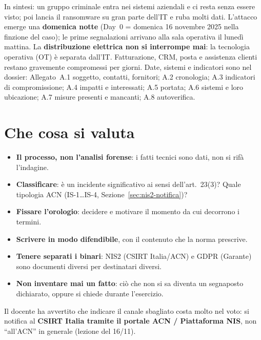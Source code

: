 In sintesi: un gruppo criminale entra nei sistemi aziendali e ci resta senza essere visto; poi lancia il
ransomware su gran parte dell'IT e ruba molti dati. L'attacco emerge una \textbf{domenica notte} (Day~0
= domenica 16 novembre 2025 nella finzione del caso); le prime segnalazioni arrivano alla sala
operativa il lunedì mattina. La \textbf{distribuzione elettrica non si interrompe mai}: la tecnologia
operativa (OT) è separata dall'IT. Fatturazione, CRM, posta e assistenza clienti restano gravemente
compromessi per giorni. Date, sistemi e indicatori sono nel dossier: Allegato~A.1 soggetto, contatti,
fornitori; A.2 cronologia; A.3 indicatori di compromissione; A.4 impatti e interessati; A.5 portata;
A.6 sistemi e loro ubicazione; A.7 misure presenti e mancanti; A.8 autoverifica.

\section{Che cosa si valuta}

\begin{itemize}
  \item \textbf{Il processo, non l'analisi forense}: i fatti tecnici sono dati, non si rifà l'indagine.
  \item \textbf{Classificare}: è un incidente significativo ai sensi dell'art.~23(3)? Quale tipologia ACN
    (IS-1\ldots IS-4, Sezione~\ref{sec:nis2-notifica})?
  \item \textbf{Fissare l'orologio}: decidere e motivare il momento da cui decorrono i termini.
  \item \textbf{Scrivere in modo difendibile}, con il contenuto che la norma prescrive.
  \item \textbf{Tenere separati i binari}: NIS2 (CSIRT Italia/ACN) e GDPR (Garante) sono documenti
    diversi per destinatari diversi.
  \item \textbf{Non inventare mai un fatto}: ciò che non si sa diventa un segnaposto dichiarato, oppure
    si chiede durante l'esercizio.
\end{itemize}

\begin{esame}
Il docente ha avvertito che indicare il canale sbagliato costa molto nel voto: si notifica al
\textbf{CSIRT Italia tramite il portale ACN / Piattaforma NIS}, non ``all'ACN'' in generale
(lezione del 16/11).
\end{esame}


